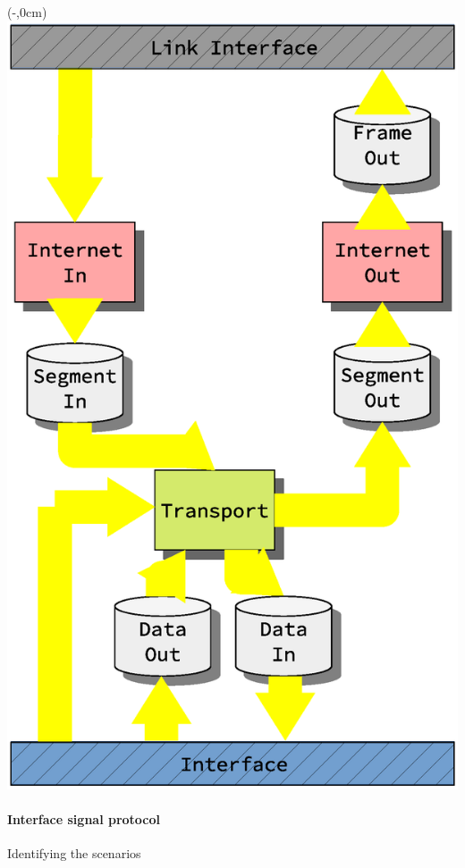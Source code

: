 \begin{frame}[fragile]
\begin{figure}[ht]
\begin{overlayarea}{0.76\textwidth}{\textheight}
        \end{overlayarea}
    \end{figure}
\end{frame}


\begin{frame}[fragile]
    \begin{textblock*}{\displayThumbnail}(\paperwidth-\displayThumbnail-0.2cm,0cm) %
        \colorbox{white}{\includegraphics[width=\textwidth]{implementation/design_2_busses.eps}}
    \end{textblock*}
    \frametitle{\ImplementationTitle}
    \framesubtitle{Interface signal protocol}
Identifying the scenarios


\end{frame}
